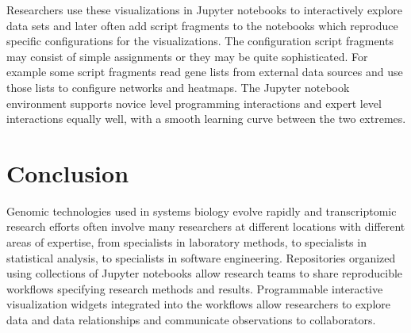 \documentclass[10pt,letterpaper]{article}
\begin{document}
Researchers use these visualizations in Jupyter notebooks to interactively explore data sets and later often
add script fragments to the notebooks which reproduce specific configurations for the visualizations.
The configuration script fragments may consist of simple assignments or they may be quite sophisticated.  For example
some script fragments read gene lists from external data sources and use those lists to configure
networks and heatmaps.  The Jupyter notebook environment supports novice level programming interactions
and expert level interactions equally well, with a smooth learning curve between the two extremes.

\section{Conclusion}

Genomic technologies used in systems biology evolve rapidly and transcriptomic research
efforts often involve many researchers at different locations with different areas of expertise, from specialists
in laboratory methods, to specialists in statistical analysis, to specialists in
software engineering.  Repositories organized using collections of
Jupyter notebooks allow research teams to share reproducible workflows 
specifying research methods and results.  Programmable
interactive visualization widgets integrated into the workflows allow researchers
to explore data and data relationships and communicate observations to collaborators.


\nolinenumbers




\end{document}
